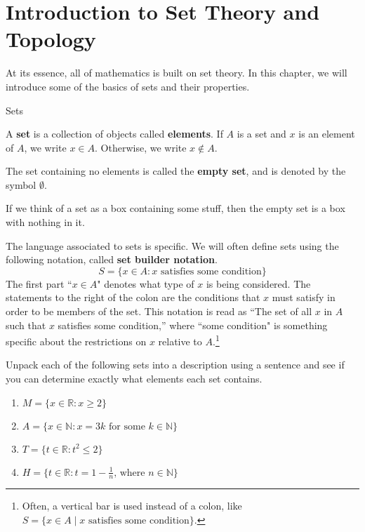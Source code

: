 \chapter{Introduction to Set Theory and Topology}

At its essence, all of mathematics is built on set theory.  In this chapter, we will introduce some of the basics of sets and their properties.

\begin{section}{Sets} 

\begin{definition}
A \textbf{set} is a collection of objects called \textbf{elements}. If $A$ is a set and $x$ is an element of $A$, we write
$x\in A$. Otherwise, we write $x\notin A$.
\end{definition}

\begin{definition}
The set containing no elements is called the \textbf{empty set}, and is denoted by the symbol $\emptyset$.
\end{definition}

If we think of a set as a box containing some stuff, then the empty set is a box with nothing in it.

\begin{definition} 
The language associated to sets is specific.  We will often define sets using the following notation, called \textbf{set builder notation}.
\[
S=\{x \in A: x \text{ satisfies some condition}\}
\]
The first part ``$x \in A$" denotes what type of $x$ is being considered.  The statements to the right of the colon are the conditions that $x$ must satisfy in order to be members of the set.  This notation is read as ``The set of all $x$ in $A$ such that $x$ satisfies some condition,'' where ``some condition" is something specific about the restrictions on $x$ relative to $A$.\footnote{Often, a vertical bar is used instead of a colon, like $S=\{x \in A \mid x \text{ satisfies some condition}\}$.}
\end{definition}

\begin{exercise}
Unpack each of the following sets into a description using a sentence and see if you can determine exactly what elements each set contains.
\begin{enumerate}
\item $M=\{x \in \mathbb{R} :  x \geq 2 \}$
\item $A=\{x \in \mathbb{N} : x = 3k \mbox{ for some } k\in \mathbb{N} \}$
\item $T=\{t \in \mathbb{R} : t^2 \leq 2 \}$
\item $H=\{t \in \mathbb{R} : t = 1 - \frac{1}{n} \mbox{, where } n \in \mathbb{N} \}$
\end{enumerate}
\end{exercise}


\end{section}
